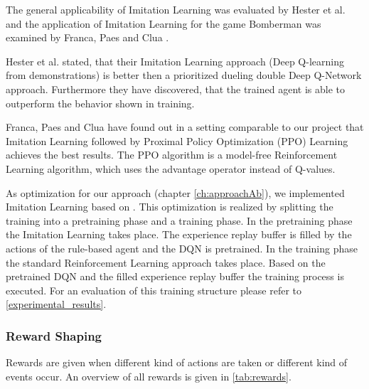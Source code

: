 The general applicability of Imitation Learning was evaluated by Hester et al. \cite{hester2017deep} and the application of Imitation Learning for the game Bomberman was examined by Franca, Paes and Clua \cite{Franca2019}.

Hester et al. \cite{hester2017deep} stated, that their Imitation Learning approach (Deep Q-learning from demonstrations) is better then a prioritized dueling double Deep Q-Network approach. Furthermore they have discovered, that the trained agent is able to outperform the behavior shown in training.

Franca, Paes and Clua \cite{Franca2019} have found out in a setting comparable to our project that Imitation Learning followed by Proximal Policy Optimization (PPO) Learning achieves the best results. The PPO algorithm is a model-free Reinforcement Learning algorithm, which uses the advantage operator instead of Q-values.

As optimization for our approach (chapter \ref{ch:approachAb}), we implemented Imitation Learning based on \cite{hester2017deep}. This optimization is realized by splitting the training into a pretraining phase and a training phase. In the pretraining phase the Imitation Learning takes place. The experience replay buffer is filled by the actions of the rule-based agent and the DQN is pretrained.
In the training phase the standard Reinforcement Learning approach takes place. Based on the pretrained DQN and the filled experience replay buffer the training process is executed. For an evaluation of this training structure please refer to \autoref{experimental_results}.

\subsubsection{Reward Shaping}
\label{ch:approachBd}

Rewards are given when different kind of actions are taken or different kind of events occur. An overview of all rewards is given in \autoref{tab:rewards}.

